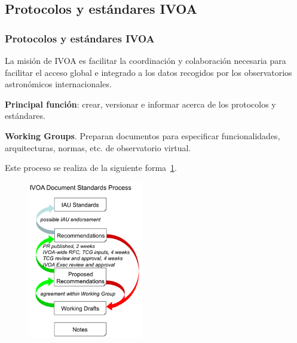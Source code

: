\subsection{Protocolos y estándares IVOA}
\begin{frame}
\frametitle{Protocolos y estándares IVOA}
\begin{multicols}{2}
La misión de IVOA es facilitar la coordinación y colaboración necesaria para
facilitar el acceso global e integrado a los datos recogidos por los
observatorios astronómicos internacionales.

\textbf{Principal función}: crear, versionar e informar acerca de los
protocolos y estándares. %

\textbf{Working Groups}. Preparan documentos para especificar funcionalidades,
arquitecturas, normas, etc. de observatorio virtual.

Este proceso se realiza de la siguiente forma~\ref{fig:creacionestandares}.
\begin{figure}[h!t]
        \centering
         \includegraphics[width=0.45\textwidth]{img/diagrama_proceso.png}
        \label{fig:creacionestandares}
\end{figure}
\end{multicols}
\end{frame}


